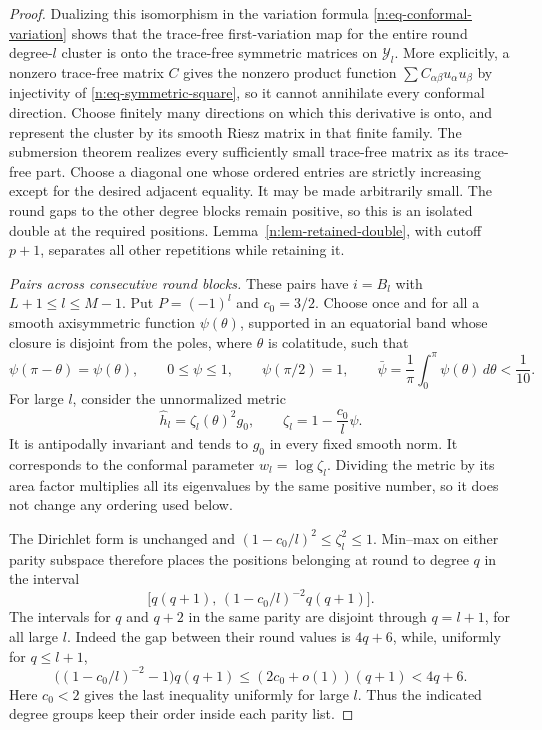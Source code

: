 \begin{proof}
Dualizing this isomorphism in the variation formula
\eqref{n:eq-conformal-variation} shows that the trace-free
first-variation map for the entire round degree-\(l\) cluster is onto
the trace-free symmetric matrices on \(\mathcal Y_l\).  More
explicitly, a nonzero trace-free matrix \(C\) gives the nonzero
product function \(\sum C_{\alpha\beta}u_\alpha u_\beta\) by
injectivity of \eqref{n:eq-symmetric-square}, so it cannot annihilate
every conformal direction.  Choose finitely many directions on which
this derivative is onto, and represent the cluster by its smooth
Riesz matrix in that finite family.  The submersion theorem realizes
every sufficiently small trace-free matrix as its trace-free part.
Choose a diagonal one whose ordered entries are strictly increasing
except for the desired adjacent equality.  It may be made
arbitrarily small.  The round gaps to the other degree blocks remain
positive, so this is an isolated double at the required positions.
Lemma~\ref{n:lem-retained-double}, with cutoff \(p+1\), separates all
other repetitions while retaining it.

\emph{Pairs across consecutive round blocks.}
These pairs have \(i=B_l\) with \(L+1\leq l\leq M-1\).
Put \(P=(-1)^l\) and \(c_0=3/2\).  Choose once and for all a smooth
axisymmetric function \(\psi(\theta)\), supported in an equatorial
band whose closure is disjoint from the poles, where \(\theta\) is
colatitude, such that
\begin{equation}\label{n:eq-equatorial-bump}
 \psi(\pi-\theta)=\psi(\theta),\qquad
 0\leq\psi\leq1,\qquad \psi(\pi/2)=1,\qquad
 \bar\psi=\frac1\pi\int_0^\pi\psi(\theta)\,d\theta<\frac1{10}.
\end{equation}
For large \(l\), consider the unnormalized metric
\begin{equation}\label{n:eq-parity-metric}
 \widehat h_l=\zeta_l(\theta)^2g_0,\qquad
 \zeta_l=1-\frac{c_0}{l}\psi.
\end{equation}
It is antipodally invariant and tends to \(g_0\) in every fixed
smooth norm.  It corresponds to the conformal parameter
\(w_l=\log\zeta_l\).  Dividing the metric by its area factor
multiplies all its eigenvalues by the same positive number, so it
does not change any ordering used below.

The Dirichlet form is unchanged and
\((1-c_0/l)^2\leq\zeta_l^2\leq1\).  Min--max on either parity
subspace therefore places the positions belonging at round to
degree \(q\) in the interval
\begin{equation}\label{n:eq-parity-form-bounds}
 \bigl[q(q+1),\,(1-c_0/l)^{-2}q(q+1)\bigr].
\end{equation}
The intervals for \(q\) and \(q+2\) in the same parity are disjoint
through \(q=l+1\), for all large \(l\).  Indeed the gap between their
round values is \(4q+6\), while, uniformly for \(q\leq l+1\),
\[
 \bigl((1-c_0/l)^{-2}-1\bigr)q(q+1)
 \leq (2c_0+o(1))(q+1)<4q+6.
\]
Here \(c_0<2\) gives the last inequality uniformly for large \(l\).
Thus the indicated degree groups keep their order inside each
parity list.


\end{proof}

